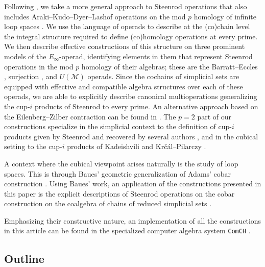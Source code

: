 Following \cite{may70generalapproach}, we take a more general approach to Steenrod operations that also includes Araki--Kudo--Dyer--Lashof operations on the mod $p$ homology of infinite loop spaces \cites{araki56squaring, dyer62lashof}.
We use the language of operads \cite{may72geometry} to describe at the (co)chain level the integral structure required to define (co)homology operations at every prime.
We then describe effective constructions of this structure on three prominent models of the $E_\infty$-operad, identifying elements in them that represent Steenrod operations in the mod $p$ homology of their algebras; these are the Barratt--Eccles \cite{berger04combinatorial}, surjection \cite{mcclure03cochain}, and $U(\mathcal M)$ \cite{medina2020prop1} operads.
Since the cochains of simplicial sets are equipped with effective and compatible algebra structures over each of these operads, we are able to explicitly describe canonical multioperations generalizing the \mbox{cup-$i$} products of Steenrod to every prime.
An alternative approach based on the Eilenberg--Zilber contraction can be found in \cite{gonzalez2005hpt}.
The $p = 2$ part of our constructions specialize in the simplicial context to the definition of cup-$i$ products given by Steenrod \cite{steenrod47products} and recovered by several authors \cites{mcclure03cochain, berger04combinatorial, medina2021newformulas}, and in the cubical setting to the cup-$i$ products of Kadeishvili \cite{kadeishvili1998dg} and Kr\v{c}\'{a}l--Pilarczy \cite{pilarczyk2016cubical}.

A context where the cubical viewpoint arises naturally is the study of loop spaces.
This is through Baues' geometric generalization of Adams' cobar construction \cite{baues1980geometry, adams1957cobar}.
Using Baues' work, an application of the constructions presented in this paper is the explicit descriptions of Steenrod operations on the cobar construction on the coalgebra of chains of reduced simplicial sets \cite{medina2021cobar}.

Emphasizing their constructive nature, an implementation of all the constructions in this article can be found in the specialized computer algebra system \texttt{ComCH} \cite{medina2021computer}.

\subsection{Outline}

